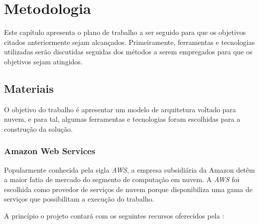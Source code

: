 
\chapter{Metodologia}\label{cap:metodologia}


Este capítulo apresenta o plano de trabalho a ser seguido para que os objetivos citados
anteriormente sejam alcançados. Primeiramente, ferramentas e tecnologias utilizadas serão discutidas seguidas dos métodos a serem empregados para que os objetivos sejam atingidos.

\section{Materiais}\label{sec:materiais}

O objetivo do trabalho é apresentar um modelo de arquitetura voltado para nuvem, e para tal, algumas ferramentas e tecnologias foram escolhidas para a construção da solução.

\subsection{Amazon Web Services}\label{subsec:amazonWebServices}

Popularmente conhecida pela sigla \textit{AWS}, a empresa subsidiária da Amazon detêm a maior fatia de mercado do segmento de computação em nuvem. A \textit{AWS} foi escolhida como provedor de serviços de nuvem porque disponibiliza uma gama de serviços que possibilitam a execução do trabalho.

A princípio o projeto contará com os seguintes recursos oferecidos pela \citet{awsconceitosbasicos}: 

